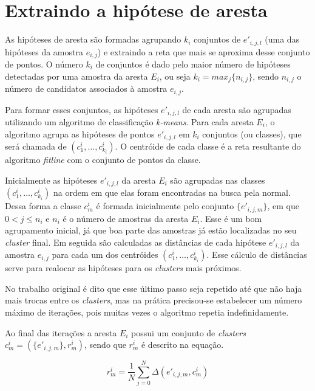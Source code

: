 \section{Extraindo a hipótese de aresta}

As hipóteses de aresta são formadas agrupando $k_i$ conjuntos de $e'_{i,j,l}$ (uma das hipóteses da amostra $e_{i,j}$) e extraindo a reta que mais se aproxima desse conjunto de pontos. O número $k_i$ de conjuntos é dado pelo maior número de hipóteses detectadas por uma amostra da aresta $E_i$, ou seja $k_i = max_j\{n_{i,j}\}$, sendo $n_{i,j}$ o número de candidatos associados à amostra $e_{i,j}$.

Para formar esses conjuntos, as hipóteses $e'_{i,j,l}$ de cada aresta são agrupadas utilizando um algoritmo de classificação \emph{k-means}. Para cada aresta $E_i$, o algoritmo agrupa as hipóteses de pontos $e'_{i,j,l}$ em $k_i$ conjuntos (ou classes), que será chamada de $(c^i_1, \dots, c^i_{k_i})$. O centróide de cada classe é a reta resultante do algoritmo \emph{fitline} \cite{fitline_doc} com o conjunto de pontos da classe.

Inicialmente as hipóteses $e'_{i,j,l}$ da aresta $E_i$ são agrupadas nas classes $(c^i_1, \dots, c^i_{k_i})$ na ordem em que elas foram encontradas na busca pela normal. Dessa forma a classe $c^i_m$ é formada inicialmente pelo conjunto $\{e'_{i,j,m}\}$, em que $0 < j \leq n_i$ e $n_i$ é o número de amostras da aresta $E_i$. Esse é um bom agrupamento inicial, já que boa parte das amostras já estão localizadas no seu \emph{cluster} final. Em seguida são calculadas as distâncias de cada hipótese $e'_{i,j,l}$ da amostra $e_{i,j}$ para cada um dos centróides $(c^i_1, \dots, c^i_{k_i})$. Esse cálculo de distâncias serve para realocar as hipóteses para os \emph{clusters} mais próximos.

No trabalho original \cite{celine} é dito que esse último passo seja repetido até que não haja mais trocas entre os \emph{clusters}, mas na prática precisou-se estabelecer um número máximo de iterações, pois muitas vezes o algoritmo repetia indefinidamente.


Ao final das iterações a aresta $E_i$ possui um conjunto de \emph{clusters} $c^i_m = (\{e'_{i,j,m}\}, r^i_m)$, sendo que $r^i_m$ é descrito na equação.

\begin{equation}
r^i_m = \frac{1}{N} \sum^{N}_{j = 0} \Delta (e'_{i,j,m}, c^i_m)
\end{equation}

